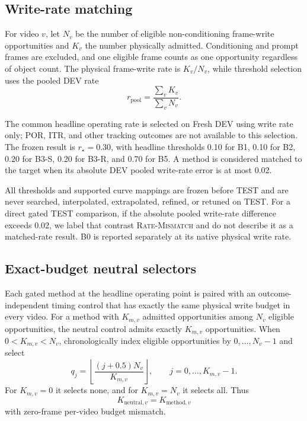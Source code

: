 \documentclass[10pt,twocolumn,letterpaper]{article}
\begin{document}
\subsection{Write-rate matching}

For video \(v\), let \(N_v\) be the number of eligible non-conditioning
frame-write opportunities and \(K_v\) the number physically admitted.
Conditioning and prompt frames are excluded, and one eligible frame counts as
one opportunity regardless of object count.  The physical frame-write rate
is \(K_v/N_v\), while threshold selection uses the pooled DEV rate
\[
    r_{\mathrm{pool}}
    =
    \frac{\sum_v K_v}{\sum_v N_v}.
\]

The common headline operating rate is selected on Fresh DEV using write rate
only; POR, ITR, and other tracking outcomes are not available to this
selection.  The frozen result is \(r_\star=0.30\), with headline thresholds
0.10 for B1, 0.10 for B2, 0.20 for B3-S, 0.20 for B3-R, and 0.70 for B5.
A method is considered matched to the target when its absolute DEV pooled
write-rate error is at most 0.02.

All thresholds and supported curve mappings are frozen before TEST and are
never searched, interpolated, extrapolated, refined, or retuned on TEST.
For a direct gated TEST comparison, if the absolute pooled write-rate
difference exceeds 0.02, we label that contrast \textsc{Rate-Mismatch} and
do not describe it as a matched-rate result.  B0 is reported separately at
its native physical write rate.

\subsection{Exact-budget neutral selectors}

Each gated method at the headline operating point is paired with an
outcome-independent timing control that has exactly the same physical write
budget in every video.  For a method with \(K_{m,v}\) admitted opportunities
among \(N_v\) eligible opportunities, the neutral control admits exactly
\(K_{m,v}\) opportunities.  When \(0<K_{m,v}<N_v\), chronologically index
eligible opportunities by \(0,\ldots,N_v-1\) and select
\[
    q_j =
    \left\lfloor
    \frac{(j+0.5)N_v}{K_{m,v}}
    \right\rfloor,
    \qquad
    j=0,\ldots,K_{m,v}-1.
\]
For \(K_{m,v}=0\) it selects none, and for \(K_{m,v}=N_v\) it selects all.
Thus
\[
    K_{\mathrm{neutral},v}=K_{\mathrm{method},v}
\]
with zero-frame per-video budget mismatch.
\end{document}
